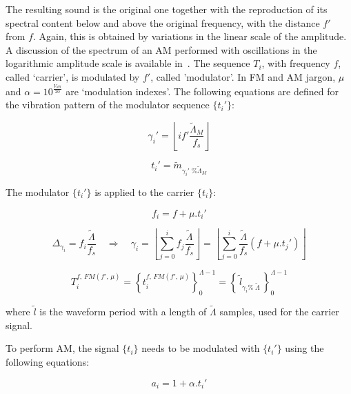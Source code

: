 The resulting sound is the original one together with the
reproduction of its spectral content below and above the original frequency, with the distance $f'$ from $f$. Again, this is obtained by variations in the linear scale of the amplitude. A discussion of the
spectrum of an AM performed with oscillations in the logarithmic amplitude scale is available in~\cite{dissertacao}. The sequence $T_i$, with frequency $f$, called `carrier', is modulated by
$f'$, called 'modulator'. In FM and AM jargon, $\mu$ and
$\alpha=10^{\frac{V_{dB}}{20}}$ are `modulation indexes'. The following equations are defined for the vibration pattern of the modulator sequence $\{t_i'\}$:

\begin{equation}\label{fmGammaAux}
\gamma_i'=\left \lfloor i f' \frac{\widetilde{\Lambda}_M}{f_s} \right \rfloor
\end{equation}

\begin{equation}\label{fmAux}
t_i'=\widetilde{m}_{\gamma_i' \;\% \widetilde{\Lambda}_M}
\end{equation}

The modulator $\{t_i'\}$ is applied to the carrier $\{t_i\}$:

\begin{equation}\label{fmF}
f_i=f + \mu . t_i'
\end{equation}

\begin{equation}\label{fmGamma}
\Delta_{\gamma_i}=f_i\frac{\widetilde{\Lambda}}{f_s} \quad \Rightarrow \quad \gamma_i = \left \lfloor \sum_{j=0}^{i} f_j \frac{\widetilde{\Lambda}}{f_s} \right \rfloor = \left \lfloor \sum_{j=0}^{i} \frac{\widetilde{\Lambda}}{f_s}(f+\mu . t_j') \right\rfloor
\end{equation}

\begin{equation}\label{fmT}
T_i^{f,\, FM(f',\,\mu)}=\left\{ t_i^{f,\,FM(f',\,\mu)} \right\}_0^{\Lambda-1}=\left\{\,\widetilde{l}_{\gamma_i \%\; \widetilde{\Lambda} } \,\right\}_0^{\Lambda-1}
\end{equation}


\noindent where $\widetilde{l}$ is the waveform period with a length of $\widetilde{\Lambda}$ samples, used for the carrier signal.

To perform AM, the signal $\{t_i\}$ needs to be modulated with $\{t_i'\}$ using the following equations:

\begin{equation}\label{amA}
a_i=1 + \alpha . t_i'
\end{equation}


